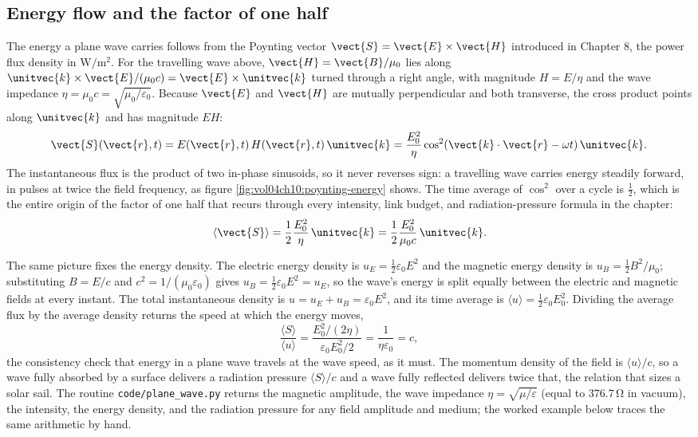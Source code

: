 \subsection{Energy flow and the factor of one half}

The energy a plane wave carries follows from the Poynting vector
$\vect{S} = \vect{E}\times \vect{H}$ introduced in Chapter 8, the
power flux density in $\si{\watt\per\meter\squared}$. For the
travelling wave above, $\vect{H} = \vect{B}/\mu_0$ lies along
$\unitvec{k}\times \vect{E}/(\mu_0 c) = \vect{E}\times \unitvec{k}$
turned through a right angle, with magnitude $H = E/\eta$ and the wave
impedance $\eta = \mu_0 c = \sqrt{\mu_0/\varepsilon_0}$. Because
$\vect{E}$ and $\vect{H}$ are mutually perpendicular and both
transverse, the cross product points along $\unitvec{k}$ and has
magnitude $EH$:
\[
\vect{S}(\vect{r},t) = E(\vect{r},t)\,H(\vect{r},t)\,\unitvec{k} =
\frac{E_0^{2}}{\eta}\cos^{2}(\vect{k}\cdot \vect{r} - \omega t)\,
\unitvec{k}.
\]
The instantaneous flux is the product of two in-phase sinusoids, so it
never reverses sign: a travelling wave carries energy steadily forward,
in pulses at twice the field frequency, as figure
\ref{fig:vol04ch10:poynting-energy} shows. The time average of
$\cos^{2}$ over a cycle is $\tfrac{1}{2}$, which is the entire origin of
the factor of one half that recurs through every intensity, link
budget, and radiation-pressure formula in the chapter:
\[
\langle \vect{S}\rangle = \frac{1}{2}\frac{E_0^{2}}{\eta}\,\unitvec{k}
= \frac{1}{2}\frac{E_0^{2}}{\mu_0 c}\,\unitvec{k}.
\]



The same picture fixes the energy density. The electric energy density
is $u_E = \tfrac{1}{2}\varepsilon_0 E^{2}$ and the magnetic energy
density is $u_B = \tfrac{1}{2}B^{2}/\mu_0$; substituting $B = E/c$ and
$c^{2} = 1/(\mu_0\varepsilon_0)$ gives $u_B = \tfrac{1}{2}\varepsilon_0
E^{2} = u_E$, so the wave's energy is split equally between the electric
and magnetic fields at every instant. The total instantaneous density
is $u = u_E + u_B = \varepsilon_0 E^{2}$, and its time average is
$\langle u\rangle = \tfrac{1}{2}\varepsilon_0 E_0^{2}$. Dividing the
average flux by the average density returns the speed at which the
energy moves,
\[
\frac{\langle S\rangle}{\langle u\rangle} = \frac{E_0^{2}/(2\eta)}
{\varepsilon_0 E_0^{2}/2} = \frac{1}{\eta\varepsilon_0} = c,
\]
the consistency check that energy in a plane wave travels at the wave
speed, as it must. The momentum density of the field is $\langle
u\rangle/c$, so a wave fully absorbed by a surface delivers a radiation
pressure $\langle S\rangle/c$ and a wave fully reflected delivers twice
that, the relation that sizes a solar sail. The routine
\texttt{code/plane\_wave.py} returns the magnetic amplitude, the wave
impedance $\eta = \sqrt{\mu/\varepsilon}$ (equal to $376.7\,\si{\ohm}$
in vacuum), the intensity, the energy density, and the radiation
pressure for any field amplitude and medium; the worked example below
traces the same arithmetic by hand.

